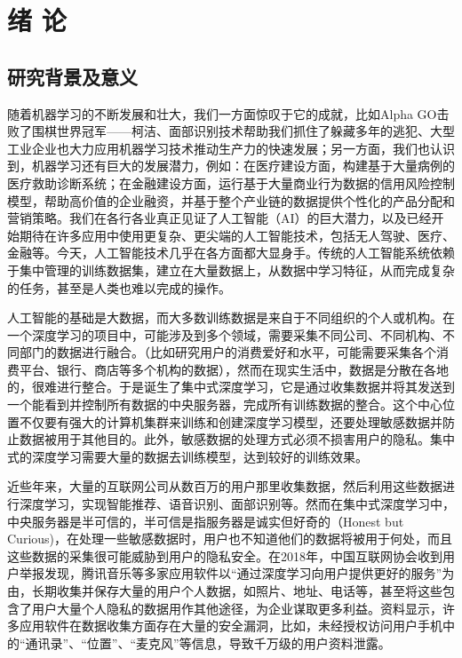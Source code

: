 \chapter{绪\hskip 0.4cm 论}
\label{ch1}

\section{研究背景及意义}
随着机器学习的不断发展和壮大，我们一方面惊叹于它的成就，比如Alpha GO击败了围棋世界冠军——柯洁、面部识别技术帮助我们抓住了躲藏多年的逃犯、大型工业企业也大力应用机器学习技术推动生产力的快速发展；另一方面，我们也认识到，机器学习还有巨大的发展潜力，例如：在医疗建设方面，构建基于大量病例的医疗救助诊断系统；在金融建设方面，运行基于大量商业行为数据的信用风险控制模型，帮助高价值的企业融资，并基于整个产业链的数据提供个性化的产品分配和营销策略。我们在各行各业真正见证了人工智能（AI）的巨大潜力，以及已经开始期待在许多应用中使用更复杂、更尖端的人工智能技术，包括无人驾驶、医疗、金融等。今天，人工智能技术几乎在各方面都大显身手。传统的人工智能系统依赖于集中管理的训练数据集，建立在大量数据上，从数据中学习特征，从而完成复杂的任务，甚至是人类也难以完成的操作。

人工智能的基础是大数据，而大多数训练数据是来自于不同组织的个人或机构。在一个深度学习的项目中，可能涉及到多个领域，需要采集不同公司、不同机构、不同部门的数据进行融合。（比如研究用户的消费爱好和水平，可能需要采集各个消费平台、银行、商店等多个机构的数据），然而在现实生活中，数据是分散在各地的，很难进行整合。于是诞生了集中式深度学习，它是通过收集数据并将其发送到一个能看到并控制所有数据的中央服务器，完成所有训练数据的整合。这个中心位置不仅要有强大的计算机集群来训练和创建深度学习模型，还要处理敏感数据并防止数据被用于其他目的。此外，敏感数据的处理方式必须不损害用户的隐私。集中式的深度学习需要大量的数据去训练模型，达到较好的训练效果。

近些年来，大量的互联网公司从数百万的用户那里收集数据，然后利用这些数据进行深度学习，实现智能推荐、语音识别、面部识别等。然而在集中式深度学习中，中央服务器是半可信的，半可信是指服务器是诚实但好奇的（Honest but Curious)，在处理一些敏感数据时，用户也不知道他们的数据将被用于何处，而且这些数据的采集很可能威胁到用户的隐私安全。在2018年，中国互联网协会收到用户举报发现，腾讯音乐等多家应用软件以“通过深度学习向用户提供更好的服务”为由，长期收集并保存大量的用户个人数据，如照片、地址、电话等，甚至将这些包含了用户大量个人隐私的数据用作其他途径，为企业谋取更多利益。资料显示，许多应用软件在数据收集方面存在大量的安全漏洞，比如，未经授权访问用户手机中的“通讯录”、“位置”、“麦克风”等信息，导致千万级的用户资料泄露。

